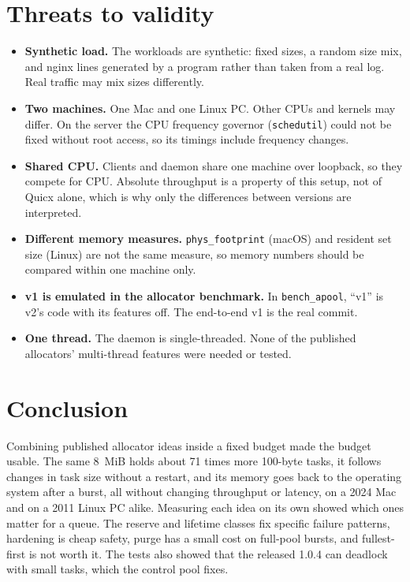\documentclass[10.5pt,a4paper]{article}
\newcommand{\file}[1]{\texttt{\small #1}}
\begin{document}
\section{Threats to validity}

\begin{itemize}
  \item \textbf{Synthetic load.} The workloads are synthetic: fixed sizes, a random size mix, and nginx lines generated by a program rather than taken from a real log. Real traffic may mix sizes differently.
  \item \textbf{Two machines.} One Mac and one Linux PC. Other CPUs and kernels may differ. On the server the CPU frequency governor (\texttt{schedutil}) could not be fixed without root access, so its timings include frequency changes.
  \item \textbf{Shared CPU.} Clients and daemon share one machine over loopback, so they compete for CPU. Absolute throughput is a property of this setup, not of Quicx alone, which is why only the differences between versions are interpreted.
  \item \textbf{Different memory measures.} \texttt{phys\_footprint} (macOS) and resident set size (Linux) are not the same measure, so memory numbers should be compared within one machine only.
  \item \textbf{v1 is emulated in the allocator benchmark.} In \file{bench\_apool}, ``v1'' is v2's code with its features off. The end-to-end v1 is the real commit.
  \item \textbf{One thread.} The daemon is single-threaded. None of the published allocators' multi-thread features were needed or tested.
\end{itemize}

\section{Conclusion}

Combining published allocator ideas inside a fixed budget made the budget usable. The same 8~MiB holds about 71 times more 100-byte tasks, it follows changes in task size without a restart, and its memory goes back to the operating system after a burst, all without changing throughput or latency, on a 2024 Mac and on a 2011 Linux PC alike. Measuring each idea on its own showed which ones matter for a queue. The reserve and lifetime classes fix specific failure patterns, hardening is cheap safety, purge has a small cost on full-pool bursts, and fullest-first is not worth it. The tests also showed that the released 1.0.4 can deadlock with small tasks, which the control pool fixes.
\end{document}
